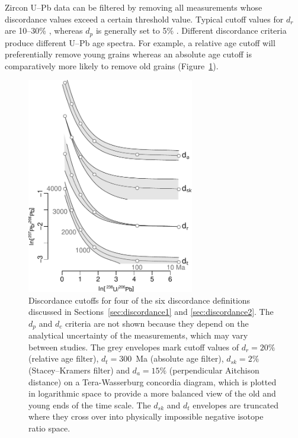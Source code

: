 \documentclass[gchron, manuscript]{copernicus}
\begin{document}
Zircon U--Pb data can be filtered by removing all measurements whose
discordance values exceed a certain threshold value. Typical cutoff
values for $d_r$ are 10--30\% \citep{gehrels2011}, whereas $d_p$ is
generally set to 5\% \citep{spencer2016}. Different discordance
criteria produce different U--Pb age spectra. For example, a relative
age cutoff will preferentially remove young grains whereas an absolute
age cutoff is comparatively more likely to remove old grains
(Figure~\ref{fig:agediscordance}).

\begin{figure}[t]
  \includegraphics[width=7.3cm]{TW-option-1234.pdf}
  \caption{Discordance cutoffs for four of the six discordance
    definitions discussed in Sections~\ref{sec:discordance1} and
    \ref{sec:discordance2}. The $d_{p}$ and $d_c$ criteria are not
    shown because they depend on the analytical uncertainty of the
    measurements, which may vary between studies. The grey envelopes
    mark cutoff values of $d_r=20\%$ (relative age filter),
    $d_t=300$~Ma (absolute age filter), $d_{sk}=2\%$ (Stacey--Kramers
    filter) and $d_{a}=15\%$ (perpendicular Aitchison distance) on a
    Tera-Wasserburg concordia diagram, which is plotted in logarithmic
    space to provide a more balanced view of the old and young ends of
    the time scale. The $d_{sk}$ and $d_t$ envelopes are truncated
    where they cross over into physically impossible negative isotope
    ratio space.}
  \label{fig:agediscordance}
\end{figure}
\end{document}
